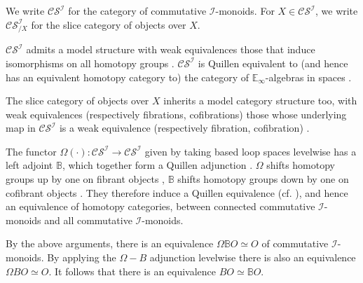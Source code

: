 \documentclass{TPmod}
\def\bB{\mathbb{B}}
\def\bE{\mathbb{E}}
\newcommand{\cC}{\mathcal{C}}
\newcommand{\cI}{\mathcal{I}}
\newcommand{\cS}{\mathcal{S}}
\numberwithin{equation}{section}
\begin{document}
    We write $\cC\cS^\cI$ for the category of commutative $\cI$-monoids. For $X \in \cC\cS^\cI$, we write $\cC\cS^\cI_{/X}$ for the slice category of objects over $X$.
    
    $\cC\cS^\cI$ admits a model structure with weak equivalences those that induce isomorphisms on all homotopy groups \cite[Proposition 3.1]{Sagave-Schlichtkrull:Gp}. $\cC\cS^\cI$ is Quillen equivalent to (and hence has an equivalent homotopy category to) the category of $\bE_\infty$-algebras in spaces \cite[Theorem 1.2]{Sagave-Schlichtkrull:Diagram}.
    
    The slice category of objects over $X$ inherits a model category structure too, with weak equivalences (respectively fibrations, cofibrations) those whose underlying map in $\cC\cS^\cI$ is a weak equivalence (respectively fibration, cofibration) \cite[Theorem 7.6.5]{Hirschhorn:book}. 

    The functor $\Omega(\cdot): \cC\cS^\cI \to \cC\cS^\cI$ given by taking based loop spaces levelwise has a left adjoint $\bB$, which together form a Quillen adjunction \cite[Corollary 4.9]{Sagave-Schlichtkrull:Gp}. $\Omega$ shifts homotopy groups up by one on fibrant objects \cite[Lemma 2.4]{Sagave-Schlichtkrull:Gp}, $\bB$ shifts homotopy groups down by one on cofibrant objects \cite[Proposition 4.2]{Sagave-Schlichtkrull:Gp}. They therefore induce a Quillen equivalence (cf. \cite[Definition 1.3.12]{Hovey}), and hence an equivalence of homotopy categories, between connected commutative $\cI$-monoids and all commutative $\cI$-monoids.

    \begin{rmk}
        By the above arguments, there is an equivalence $\Omega \bB O \simeq O$ of commutative $\cI$-monoids. By applying the $\Omega-B$ adjunction levelwise there is also an equivalence $\Omega BO \simeq O$. It follows that there is an equivalence $BO \simeq \bB O$.
    \end{rmk}
    
\end{document}
